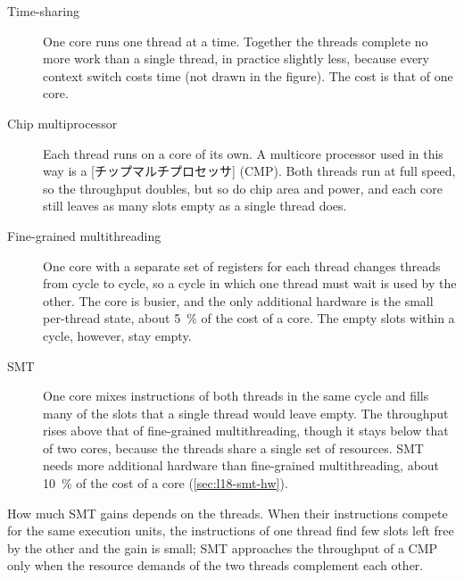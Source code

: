 \documentclass[../main.tex]{subfiles}
\begin{document}
\begin{description}
  \item[Time-sharing] One core runs one thread at a time.  Together the
    threads complete no more work than a single thread, in practice
    slightly less, because every context switch costs time (not drawn in
    the figure).  The cost is that of one core.
  \item[Chip multiprocessor] Each thread runs on a core of its own.  A
    multicore processor used in this way is a
    [チップマルチプロセッサ]%
     (CMP).  Both threads run at full
    speed, so the throughput doubles, but so do chip area and power, and
    each core still leaves as many slots empty as a single thread does.
  \item[Fine-grained multithreading] One core with a separate set of
    registers for each thread changes threads from cycle to cycle, so a
    cycle in which one thread must wait is used by the other.  The core is
    busier, and the only additional hardware is the small per-thread state,
    about \SI{5}{\percent} of the cost of a core.  The empty slots within a
    cycle, however, stay empty.
  \item[SMT] One core mixes instructions of both threads in the same cycle
    and fills many of the slots that a single thread would leave
    empty.  The
    throughput rises above that of fine-grained multithreading, though it
    stays below that of two cores, because the threads share a single set of
    resources.  SMT needs more additional hardware than fine-grained
    multithreading, about \SI{10}{\percent} of the cost of a core
    (\cref{sec:l18-smt-hw}).
\end{description}

How much SMT gains depends on the threads.  When their instructions compete
for the same execution units, the instructions of one thread find few slots
left free by the other and the gain is small; SMT approaches the throughput
of a CMP only when the resource demands of the two threads complement each
other.
\end{document}
